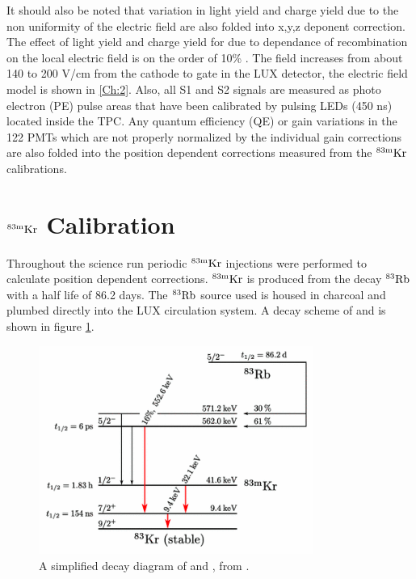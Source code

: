 It should also be noted that variation in light yield and charge yield due to the non uniformity of the electric field are also folded into x,y,z deponent correction. The effect of light yield and charge yield for \KrCal due to dependance of recombination on the local electric field is on the order of 10\% \cite{NEST_2013}. The field increases from about 140 to 200 V/cm from the cathode to gate in the LUX detector, the electric field model is shown in \ref{Ch:2}. Also, all S1 and S2 signals are measured as photo electron (PE) pulse areas that have been calibrated by pulsing LEDs (450 ns) located inside the TPC. Any quantum efficiency (QE) or gain variations in the 122 PMTs which are not properly normalized by the individual gain corrections are also folded into the position dependent corrections measured from the $\rm^{83m}Kr$ calibrations.


\section{$\rm^{83m}Kr$ Calibration}

Throughout the science run periodic $\rm^{83m}Kr$ injections were performed to calculate position dependent corrections. $\rm ^{83m}Kr$ is produced from the decay $\rm^{83}Rb$ with a half life of 86.2 days. The $\rm^{83}Rb$ source used is housed in charcoal and plumbed directly into the LUX circulation system.  A decay scheme of \Rb and \KrCal is shown in figure \ref{fig:Kr_Decay}.

\begin{figure}[h!]\centering
\includegraphics[width=90mm]{Chapter_XYZ_Corr/Thesis_Corr_Plots/RbKr_83_Decay.png}
\caption{A simplified decay diagram of \Rb and \KrCal, from \cite{Kr_Decay_Diagram}.}
\label{fig:Kr_Decay}
\end{figure}

